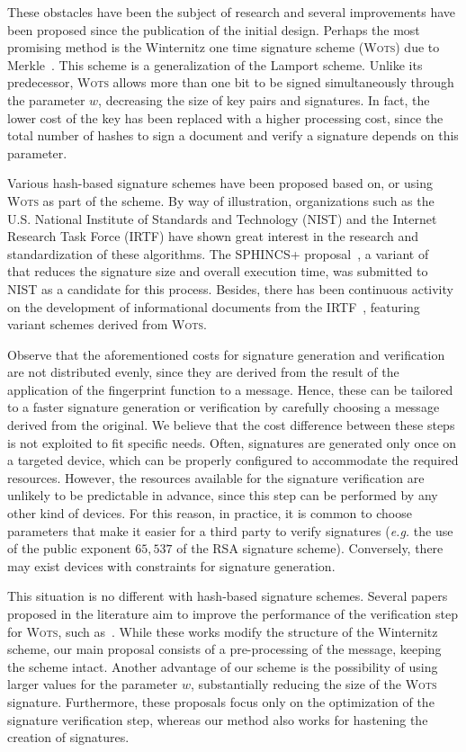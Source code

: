\documentclass[12pt]{article}
\newcommand{\wots}{\textsc{Wots}}
\begin{document}
These obstacles have been the subject of research and several improvements have
been proposed since the publication of the initial design. Perhaps the most
promising method is the Winternitz one time signature scheme (\wots{})
due to Merkle~\cite{Merkle:inproc:1989:aug}. This scheme is a generalization of
the Lamport scheme. Unlike its predecessor, \wots{} allows more than one
bit to be signed simultaneously through the parameter $w$, decreasing the size
of key pairs and signatures. In fact, the lower cost of the key has been
replaced with a higher processing cost, since the total number of hashes to
sign a document and verify a signature depends on this parameter.

Various hash-based signature schemes have been proposed based on, or using
\wots{} as part of the scheme. By way of illustration, organizations such
as the U.S. National Institute of Standards and Technology (NIST) and the
Internet Research Task Force (IRTF) have shown great interest in the
research and standardization of these algorithms. The SPHINCS+
proposal~\cite{Bernstein:misc:2017:dec}, a variant
of~\cite{Bernstein:inproc:2015:apr} that reduces the signature size and overall
execution time, was submitted to NIST as a candidate for this process. Besides,
there has been continuous activity on the development of informational
documents from the IRTF~\cite{Huelsing:report:2018:may,McGrew:report:2018:apr},
featuring variant schemes derived from \wots{}.

Observe that the aforementioned costs for signature generation and verification
are not distributed evenly, since they are derived from the result of the
application of the fingerprint function to a message. Hence, these can be
tailored to a faster signature generation or verification by carefully choosing
a message derived from the original. We believe that the cost difference
between these steps is not exploited to fit specific needs. Often, signatures
are generated only once on a targeted device, which can be properly configured
to accommodate the required resources. However, the resources available for the
signature verification are unlikely to be predictable in advance, since this
step can be performed by any other kind of devices. For this reason, in
practice, it is common to choose parameters that make it easier for a third
party to verify signatures (\emph{e.g.} the use of the public exponent
$65{,}537$ of the RSA signature scheme). Conversely, there may exist devices
with constraints for signature generation.

This situation is no different with hash-based signature schemes. Several
papers proposed in the literature aim to improve the performance of the
verification step for \wots{}, such
as~\cite{Cruz:inproc:2016:oct,McGrew:report:2018:apr,Steinwandt:article:2008:oct}.
While these works modify the structure of the Winternitz scheme, our main
proposal consists of a pre-processing of the message, keeping the scheme
intact. Another advantage of our scheme is the possibility of using larger
values for the parameter $w$, substantially reducing the size of the
\wots{} signature. Furthermore, these proposals focus only on the
optimization of the signature verification step, whereas our method also works
for hastening the creation of signatures.
\end{document}
